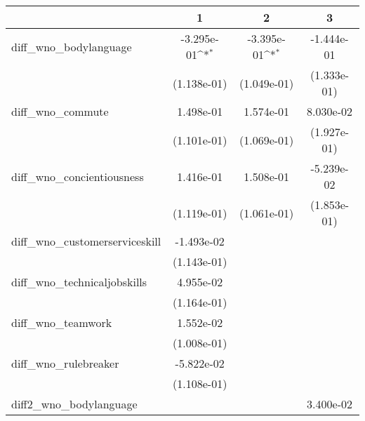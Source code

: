 {
\def\sym#1{\ifmmode^{#1}\else\(^{#1}\)\fi}
\begin{tabular}{l*{3}{c}}
    \toprule
                                    & \multicolumn{1}{c}{1} & \multicolumn{1}{c}{2} & \multicolumn{1}{c}{3} \\
    \midrule
    diff\_wno\_bodylanguage         & -3.295e-01\sym{*}     & -3.395e-01\sym{*}     & -1.444e-01            \\
                                    & (1.138e-01)           & (1.049e-01)           & (1.333e-01)           \\
    \addlinespace
    diff\_wno\_commute              & 1.498e-01             & 1.574e-01             & 8.030e-02             \\
                                    & (1.101e-01)           & (1.069e-01)           & (1.927e-01)           \\
    \addlinespace
    diff\_wno\_concientiousness     & 1.416e-01             & 1.508e-01             & -5.239e-02            \\
                                    & (1.119e-01)           & (1.061e-01)           & (1.853e-01)           \\
    \addlinespace
    diff\_wno\_customerserviceskill & -1.493e-02            &                       &                       \\
                                    & (1.143e-01)           &                       &                       \\
    \addlinespace
    diff\_wno\_technicaljobskills   & 4.955e-02             &                       &                       \\
                                    & (1.164e-01)           &                       &                       \\
    \addlinespace
    diff\_wno\_teamwork             & 1.552e-02             &                       &                       \\
                                    & (1.008e-01)           &                       &                       \\
    \addlinespace
    diff\_wno\_rulebreaker          & -5.822e-02            &                       &                       \\
                                    & (1.108e-01)           &                       &                       \\
    \addlinespace
    diff2\_wno\_bodylanguage        &                       &                       & 3.400e-02             \\

\end{tabular}}
